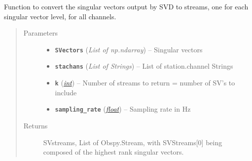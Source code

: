 \documentclass[a4paper,10pt,english]{sphinxmanual}
\begin{document}
\begin{fulllineitems}
\label{utils:clustering.SVD_2_stream}
Function to convert the singular vectors output by SVD to streams, one for
each singular vector level, for all channels.
\begin{quote}\begin{description}
\item[{Parameters}] \leavevmode\begin{itemize}
\item {} 
\textbf{\texttt{SVectors}} (\emph{List of np.ndarray}) -- Singular vectors

\item {} 
\textbf{\texttt{stachans}} (\emph{List of Strings}) -- List of station.channel Strings

\item {} 
\textbf{\texttt{k}} (\href{https://docs.python.org/library/functions.html\#int}{\emph{int}}) -- Number of streams to return = number of SV's to include

\item {} 
\textbf{\texttt{sampling\_rate}} (\href{https://docs.python.org/library/functions.html\#float}{\emph{float}}) -- Sampling rate in Hz

\end{itemize}

\item[{Returns}] \leavevmode
SVstreams, List of Obspy.Stream, with SVStreams{[}0{]} being
composed of the highest rank singular vectors.

\end{description}\end{quote}

\end{fulllineitems}

\end{document}
